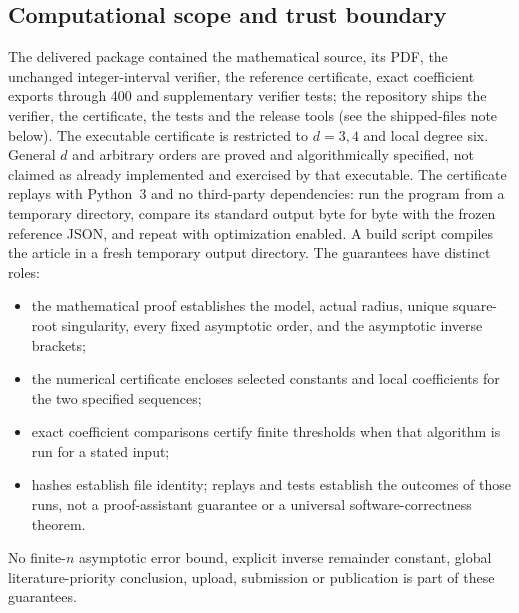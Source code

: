 \documentclass[11pt]{article}
\theoremstyle{definition}\newtheorem{definition}[theorem]{Definition}
\theoremstyle{remark}\newtheorem{remark}[theorem]{Remark}
\begin{document}
\subsection{Computational scope and trust boundary}
The delivered package contained the mathematical source, its PDF, the
unchanged integer-interval verifier, the reference certificate, exact
coefficient exports through 400 and supplementary verifier tests; the
repository ships the verifier, the certificate, the tests and the release
tools (see the shipped-files note below). The executable certificate is
restricted to $d=3,4$ and local degree six. General $d$ and arbitrary orders are
proved and algorithmically specified, not claimed as already implemented and
exercised by that executable. The certificate replays with Python~3 and no
third-party dependencies: run the program from a temporary directory, compare
its standard output byte for byte with the frozen reference JSON, and repeat
with optimization enabled. A build script compiles the article in a fresh
temporary output directory. The guarantees have distinct roles:
\begin{itemize}
\item the mathematical proof establishes the model, actual radius, unique
 square-root singularity, every fixed asymptotic order, and the asymptotic
 inverse brackets;
\item the numerical certificate encloses selected constants and local
 coefficients for the two specified sequences;
\item exact coefficient comparisons certify finite thresholds when that
 algorithm is run for a stated input;
\item hashes establish file identity; replays and tests establish the outcomes
 of those runs, not a proof-assistant guarantee or a universal
 software-correctness theorem.
\end{itemize}
No finite-$n$ asymptotic error bound, explicit inverse remainder constant,
global literature-priority conclusion, upload, submission or publication is
part of these guarantees.
\end{document}

